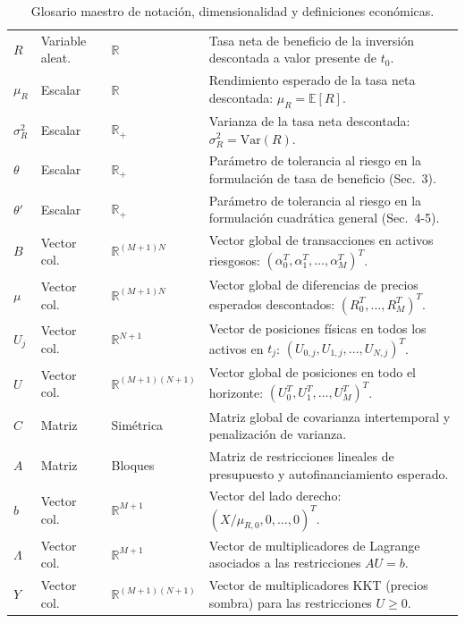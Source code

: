 \documentclass[11pt,a4paper]{report}
\numberwithin{equation}{chapter}
\begin{document}
\begin{table}[H]
\begin{tabularx}{\textwidth}{lp{2.2cm}p{2.3cm}X}
$R$ & Variable aleat. & $\mathbb{R}$ & Tasa neta de beneficio de la inversión descontada a valor presente de $t_0$. \\
$\mu_R$ & Escalar & $\mathbb{R}$ & Rendimiento esperado de la tasa neta descontada: $\mu_R = \mathbb{E}[R]$. \\
$\sigma_R^2$ & Escalar & $\mathbb{R}_+$ & Varianza de la tasa neta descontada: $\sigma_R^2 = \mathrm{Var}(R)$. \\
$\theta$ & Escalar & $\mathbb{R}_+$ & Parámetro de tolerancia al riesgo en la formulación de tasa de beneficio (Sec.~3). \\
$\theta'$ & Escalar & $\mathbb{R}_+$ & Parámetro de tolerancia al riesgo en la formulación cuadrática general (Sec.~4-5). \\
$B$ & Vector col. & $\mathbb{R}^{(M+1)N}$ & Vector global de transacciones en activos riesgosos: $(\alpha_0^T, \alpha_1^T, \dots, \alpha_M^T)^T$. \\
$\mu$ & Vector col. & $\mathbb{R}^{(M+1)N}$ & Vector global de diferencias de precios esperados descontados: $(R_0^T, \dots, R_M^T)^T$. \\
$U_j$ & Vector col. & $\mathbb{R}^{N+1}$ & Vector de posiciones físicas en todos los activos en $t_j$: $(U_{0,j}, U_{1,j}, \dots, U_{N,j})^T$. \\
$U$ & Vector col. & $\mathbb{R}^{(M+1)(N+1)}$ & Vector global de posiciones en todo el horizonte: $(U_0^T, U_1^T, \dots, U_M^T)^T$. \\
$C$ & Matriz & Simétrica & Matriz global de covarianza intertemporal y penalización de varianza. \\
$A$ & Matriz & Bloques & Matriz de restricciones lineales de presupuesto y autofinanciamiento esperado. \\
$b$ & Vector col. & $\mathbb{R}^{M+1}$ & Vector del lado derecho: $(X/\mu_{R,0}, 0, \dots, 0)^T$. \\
$\Lambda$ & Vector col. & $\mathbb{R}^{M+1}$ & Vector de multiplicadores de Lagrange asociados a las restricciones $AU = b$. \\
$Y$ & Vector col. & $\mathbb{R}^{(M+1)(N+1)}$ & Vector de multiplicadores KKT (precios sombra) para las restricciones $U \ge 0$. \\
\bottomrule
\end{tabularx}
\caption{Glosario maestro de notación, dimensionalidad y definiciones económicas.}
\label{tab:glosario_maestro}
\end{table}

\newpage
{}
\end{document}
